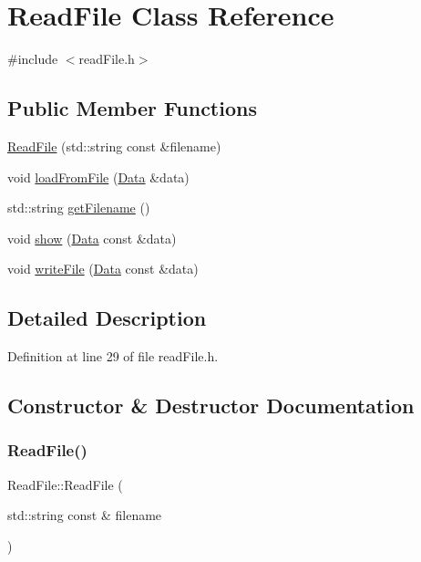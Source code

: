 \hypertarget{class_read_file}{}\section{Read\+File Class Reference}
\label{class_read_file}


{\ttfamily \#include $<$read\+File.\+h$>$}

\subsection*{Public Member Functions}
\begin{DoxyCompactItemize}
\item 
\mbox{\hyperlink{class_read_file_ae297f0539380fc9b703a1bceda2ce820}{Read\+File}} (std\+::string const \&filename)
\item 
void \mbox{\hyperlink{class_read_file_a232df426223b84e4dbb3f964ee4c3177}{load\+From\+File}} (\mbox{\hyperlink{struct_data}{Data}} \&data)
\item 
std\+::string \mbox{\hyperlink{class_read_file_a9835264c9ec95cfdbc1349573402fc01}{get\+Filename}} ()
\item 
void \mbox{\hyperlink{class_read_file_a5efc41b900510ae038dafc23a2563300}{show}} (\mbox{\hyperlink{struct_data}{Data}} const \&data)
\item 
void \mbox{\hyperlink{class_read_file_ac11779a3630a2c1d62ab4566abb4034a}{write\+File}} (\mbox{\hyperlink{struct_data}{Data}} const \&data)
\end{DoxyCompactItemize}


\subsection{Detailed Description}


Definition at line 29 of file read\+File.\+h.



\subsection{Constructor \& Destructor Documentation}
\mbox{\label{class_read_file_ae297f0539380fc9b703a1bceda2ce820}} 
\subsubsection{\texorpdfstring{Read\+File()}{ReadFile()}}
{\footnotesize\ttfamily Read\+File\+::\+Read\+File (\begin{DoxyParamCaption}\item[{std\+::string const \&}]{filename }\end{DoxyParamCaption})}







